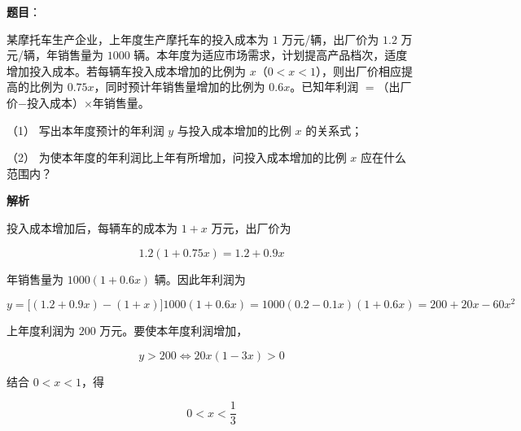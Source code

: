 \begin{answer}

\textbf{题目}：

某摩托车生产企业，上年度生产摩托车的投入成本为 $1$ 万元/辆，出厂价为 $1.2$ 万元/辆，年销售量为 $1000$ 辆。本年度为适应市场需求，计划提高产品档次，适度增加投入成本。若每辆车投入成本增加的比例为 $x$（$0<x<1$），则出厂价相应提高的比例为 $0.75x$，同时预计年销售量增加的比例为 $0.6x$。已知年利润 $=$（出厂价$-$投入成本）$\times$年销售量。

（1） 写出本年度预计的年利润 $y$ 与投入成本增加的比例 $x$ 的关系式；

（2） 为使本年度的年利润比上年有所增加，问投入成本增加的比例 $x$ 应在什么范围内？

\textbf{解析}


投入成本增加后，每辆车的成本为 $1+x$ 万元，出厂价为

\nopagebreak[4]
\[
1.2(1+0.75x)=1.2+0.9x
\]

年销售量为 $1000(1+0.6x)$ 辆。因此年利润为

\nopagebreak[4]
\[
y=\bigl[(1.2+0.9x)-(1+x)\bigr]1000(1+0.6x)
=1000(0.2-0.1x)(1+0.6x)
=200+20x-60x^2
\]


上年度利润为 $200$ 万元。要使本年度利润增加，

\nopagebreak[4]
\[
y>200
\Longleftrightarrow
20x(1-3x)>0
\]

结合 $0<x<1$，得

\nopagebreak[4]
\[
0<x<\frac13
\]



\end{answer}

